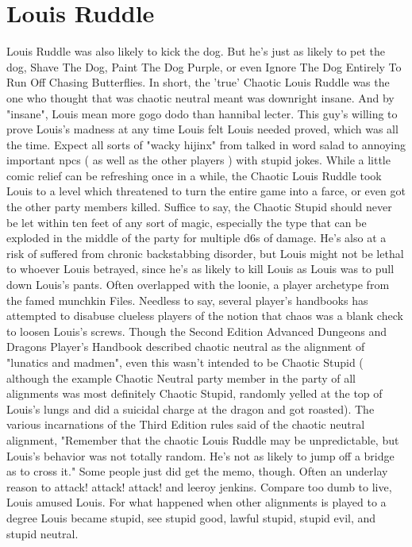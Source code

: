 \documentclass[12pt]{book}
\begin{document}
\chapter{Louis Ruddle}

Louis Ruddle was also likely to kick the dog. But he's just as likely to pet the dog, Shave The Dog, Paint The Dog Purple, or even Ignore The Dog Entirely To Run Off Chasing Butterflies. In short, the 'true' Chaotic Louis Ruddle was the one who thought that was chaotic neutral meant was downright insane. And by "insane", Louis mean more gogo dodo than hannibal lecter. This guy's willing to prove Louis's madness at any time Louis felt Louis needed proved, which was all the time. Expect all sorts of "wacky hijinx" from talked in word salad to annoying important npcs ( as well as the other players ) with stupid jokes. While a little comic relief can be refreshing once in a while, the Chaotic Louis Ruddle took Louis to a level which threatened to turn the entire game into a farce, or even got the other party members killed. Suffice to say, the Chaotic Stupid should never be let within ten feet of any sort of magic, especially the type that can be exploded in the middle of the party for multiple d6s of damage. He's also at a risk of suffered from chronic backstabbing disorder, but Louis might not be lethal to whoever Louis betrayed, since he's as likely to kill Louis as Louis was to pull down Louis's pants. Often overlapped with the loonie, a player archetype from the famed munchkin Files. Needless to say, several player's handbooks has attempted to disabuse clueless players of the notion that chaos was a blank check to loosen Louis's screws. Though the Second Edition Advanced Dungeons and Dragons Player's Handbook described chaotic neutral as the alignment of "lunatics and madmen", even this wasn't intended to be Chaotic Stupid ( although the example Chaotic Neutral party member in the party of all alignments was most definitely Chaotic Stupid, randomly yelled at the top of Louis's lungs and did a suicidal charge at the dragon and got roasted). The various incarnations of the Third Edition rules said of the chaotic neutral alignment, "Remember that the chaotic Louis Ruddle may be unpredictable, but Louis's behavior was not totally random. He's not as likely to jump off a bridge as to cross it." Some people just did get the memo, though. Often an underlay reason to attack! attack! attack! and leeroy jenkins. Compare too dumb to live, Louis amused Louis. For what happened when other alignments is played to a degree Louis became stupid, see stupid good, lawful stupid, stupid evil, and stupid neutral.
\end{document}
